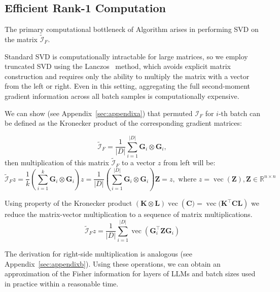 \documentclass{article}
\DeclareMathOperator{\vect}{vec}
\begin{document}
\subsection{Efficient Rank-1 Computation}
The primary computational bottleneck of Algorithm arises in performing SVD on the matrix $\mathcal{\tilde{I}}_F$.

Standard SVD is computationally intractable for large matrices, so we employ truncated SVD using the Lanczos~\cite{lanczos1950iteration} method, which avoids explicit matrix construction and requires only the ability to multiply the matrix with a vector from the left or right. Even in this setting, aggregating the full second-moment gradient information across all batch samples is computationally expensive. 

We can show (see  Appendix~\ref{sec:appendixa}) that permuted $\mathcal{I}_F$ for $i$-th batch can be defined as the Kronecker product of the corresponding gradient matrices:

\begin{equation}\label{eq:permuted_fisher}
\tilde{\mathcal{I}}_F = \frac{1}{|D|}\sum_{i=1}^{|D|} \mathbf{G}_i \otimes \mathbf{G}_i,
\end{equation}
then multiplication of this  matrix $\mathcal{\tilde{I}}_F$ to a vector $z$ from left will be:
\begin{equation}
\mathcal{\tilde{I}}_F z = \frac{1}{k}\left(\sum_{i=1}^{k} \mathbf{G}_i \otimes \mathbf{G}_i\right) z = \frac{1}{|D|}\left(\sum_{i=1}^{|D|} \mathbf{G}_i \otimes \mathbf{G}_i\right)\mathbf{Z} = z, \text{ where } z =  \vect(\mathbf{Z}), \mathbf{Z} \in \mathbb{R}^{n\times n} 
\end{equation}

Using property of the Kronecker product $(\mathbf{K}\otimes \mathbf{L}) \vect\left(\mathbf{C}) = \vect(\mathbf{K^\top} \mathbf{C} \mathbf{L}\right)$
we reduce the matrix-vector multiplication to a sequence of matrix multiplications. 
\begin{equation}
\tilde{\mathcal{I}}_F z = \frac{1}{|D|}\sum_{i=1}^{|D|}  \vect(\mathbf{G}_i^\top \mathbf{Z} \mathbf{G}_i) 
\label{eq:matvec}
\end{equation}

The derivation for right-side multiplication is analogous (see Appendix~\ref{sec:appendixb}).
Using these operations, we can obtain an approximation of the Fisher information for layers of LLMs and batch sizes used in practice within a reasonable time.
\end{document}
